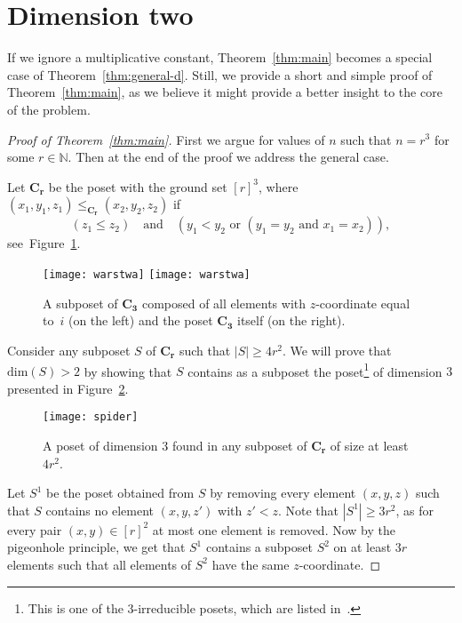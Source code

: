 \documentclass[a4paper,reqno,12pt]{amsart}
\theoremstyle{remark}
\theoremstyle{plain}
\theoremstyle{definition}
\newcommand{\pdim}[1]{\mathrm{dim}(#1)}
\let\leq\leqslant
\let\geq\geqslant
\begin{document}
\section{Dimension two}

If we ignore a multiplicative constant, Theorem~\ref{thm:main} becomes a special
case of Theorem~\ref{thm:general-d}. Still, we provide a short and simple proof
of Theorem~\ref{thm:main}, as we believe it might provide a better insight to
the core of the problem.

\begin{proof}[Proof of Theorem~\ref{thm:main}]
First we argue for values of $n$ such that $n=r^3$ for some $r\in\mathbb{N}$.
Then at the end of the proof we address the general case.

  Let $\mathbf{C_r}$ be the poset with the ground set $[r]^3$, where
  $(x_1, y_1, z_1) \leq_{\mathbf{C_r}} (x_2, y_2, z_2)$ if
  \[
    (z_1 \leq z_2)\quad \text{and}\quad
    (y_1 < y_2 \text{ or } (y_1=y_2 \text{ and } x_1=x_2)),
  \]
see~Figure~\ref{fig:C0}.

  \begin{figure}[h]
	\centering
    \ifspringer
      \texttt{[image: warstwa]}
    \else
      \texttt{[image: warstwa]}
    \fi
    \caption{\label{fig:C0}A subposet of $\mathbf{C_3}$ composed of all elements with $z$-coordinate equal to~$i$ (on the left) and the poset $\mathbf{C_3}$ itself (on the right).}
  \end{figure}

  Consider any subposet $S$ of $\mathbf{C_r}$ such that $|S| \geq 4r^2$.
  We will prove that $\pdim{S} > 2$ by showing that $S$ contains as a
  subposet the poset\footnote{This is one of the $3$-irreducible
  posets, which are listed in~\cite{Trotter1992}.} of dimension $3$
  presented in Figure~\ref{fig:spider}.

  \begin{figure}[h]
    \begin{center}
    \texttt{[image: spider]}
    \end{center}
    \caption{\label{fig:spider} A poset of dimension $3$ found in any subposet of $\mathbf{C_r}$ of size at least $4r^2$.}
  \end{figure}

Let $S^1$ be the poset obtained from $S$ by removing every element $(x,y,z)$ such that $S$ contains
no element $(x,y,z')$ with $z' < z$.
Note that $|S^1| \geq 3r^2$, as for every pair $(x,y) \in [r]^2$ at most one element is removed.
Now by the pigeonhole principle, we get that
$S^1$ contains a subposet $S^2$ on at least $3r$ elements
such that all elements of $S^2$ have the same $z$-coordinate.


\end{proof}
\end{document}
